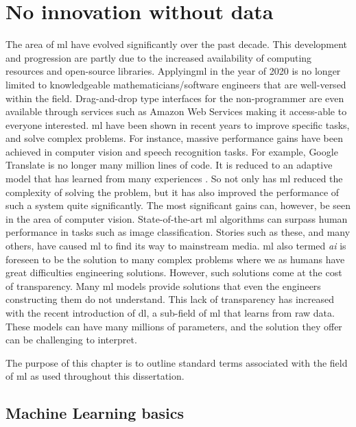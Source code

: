\chapter{No innovation without data}\label{ch:mlbasics}

The area of \gls{ml} have evolved significantly over the past decade. This development and progression are partly due to the increased availability of computing resources and open-source libraries. Applying\gls{ml} in the year of 2020 is no longer limited to knowledgeable mathematicians/software engineers that are well-versed within the field. Drag-and-drop type interfaces for the non-programmer are even available through services such as Amazon Web Services making it access-able to everyone interested. \gls{ml} have been shown in recent years to improve specific tasks, and solve complex problems. For instance, massive performance gains have been achieved in computer vision and speech recognition tasks. For example, Google Translate is no longer many million lines of code. It is reduced to an adaptive model that has learned from many experiences \cite{Wu2016GooglesTranslation}. So not only has \gls{ml} reduced the complexity of solving the problem, but it has also improved the performance of such a system quite significantly. The most significant gains can, however, be seen in the area of computer vision. State-of-the-art \gls{ml} algorithms can surpass human performance in tasks such as image classification. Stories such as these, and many others, have caused \gls{ml} to find its way to mainstream media. \gls{ml} also termed \emph{\gls{ai}} is foreseen to be the solution to many complex problems where we as humans have great difficulties engineering solutions. However, such solutions come at the cost of transparency. Many \gls{ml} models provide solutions that even the engineers constructing them do not understand. This lack of transparency has increased with the recent introduction of \gls{dl}, a sub-field of \gls{ml} that learns from raw data. These models can have many millions of parameters, and the solution they offer can be challenging to interpret. 

The purpose of this chapter is to outline standard terms associated with the field of \gls{ml} as used throughout this dissertation.



\section{Machine Learning basics}

